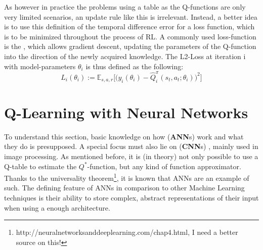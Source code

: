 As however in practice the problems using a table as the Q-functions are only very limited scenarios, an update rule like this is irrelevant. Instead, a better idea is to use this definition of the temporal difference error for a loss function, which is to be minimized throughout the process of RL. A commonly used loss-function is the , which allows gradient descent, updating the parameters of the Q-function into the direction of the newly acquired knowledge. The L2-Loss at iteration i with model-parameters $\theta_i$ is thus defined as the following:
\begin{equation} \label{l2loss}
	L_i(\theta_i) := \mathds{E}_{s,a,r} \Big[ \big( y_i(\theta_i) - \hat{Q}_i^\pi(s_t, a_t; \theta_i)\big)^2 \Big]
\end{equation}



%

\section{Q-Learning with Neural Networks}

To understand this section, basic knowledge on how  (\textbf{ANN}s) work and what they do is presupposed. A special focus must also lie on  (\textbf{CNN}s) \cite{yann_lecun_gradient-based_1998}, mainly used in image processing. As mentioned before, it is (in theory) not only possible to use a Q-table to estimate the $Q^*$-function, but any kind of function approximator. Thanks to the universality theorem\footnote{http://neuralnetworksanddeeplearning.com/chap4.html, I need a better source on this!}, it is known that ANNs are an example of such. The defining feature of ANNs in comparison to other Machine Learning techniques is their ability to store complex, abstract representations of their input when using a  enough architecture.

